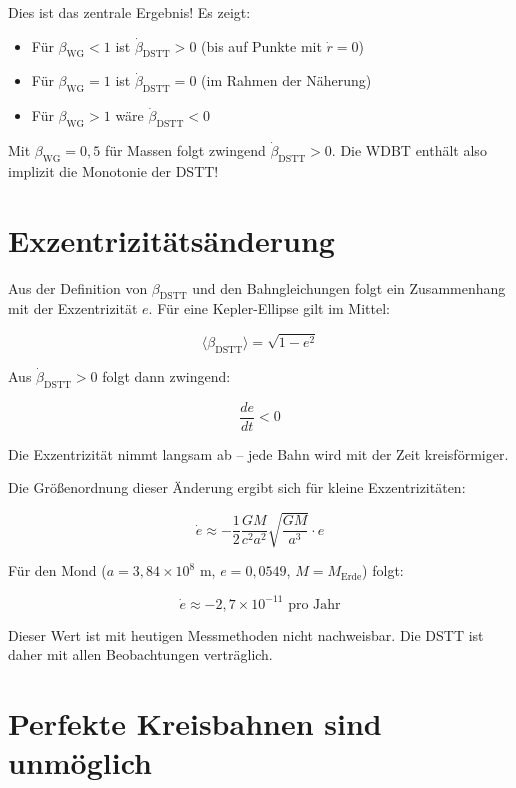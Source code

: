 Dies ist das zentrale Ergebnis! Es zeigt:

\begin{itemize}
    \item Für \(\beta_{\text{WG}} < 1\) ist \(\dot{\beta}_{\text{DSTT}} > 0\) (bis auf Punkte mit \(\dot{r} = 0\))
    \item Für \(\beta_{\text{WG}} = 1\) ist \(\dot{\beta}_{\text{DSTT}} = 0\) (im Rahmen der Näherung)
    \item Für \(\beta_{\text{WG}} > 1\) wäre \(\dot{\beta}_{\text{DSTT}} < 0\)
\end{itemize}

Mit \(\beta_{\text{WG}} = 0,5\) für Massen folgt zwingend \(\dot{\beta}_{\text{DSTT}} > 0\). Die WDBT enthält also implizit die Monotonie der DSTT!

\section{Exzentrizitätsänderung}
\label{sec:exzentrizitaetsaenderung}

Aus der Definition von \(\beta_{\text{DSTT}}\) und den Bahngleichungen folgt ein Zusammenhang mit der Exzentrizität \(e\). Für eine Kepler-Ellipse gilt im Mittel:

\[
\langle \beta_{\text{DSTT}} \rangle = \sqrt{1 - e^2}
\]

Aus \(\dot{\beta}_{\text{DSTT}} > 0\) folgt dann zwingend:

\[
\frac{de}{dt} < 0
\]

Die Exzentrizität nimmt langsam ab – jede Bahn wird mit der Zeit kreisförmiger.

Die Größenordnung dieser Änderung ergibt sich für kleine Exzentrizitäten:

\[
\dot{e} \approx -\frac{1}{2} \frac{GM}{c^2 a^2} \sqrt{\frac{GM}{a^3}} \cdot e
\]

Für den Mond (\(a = 3,84 \times 10^8\) m, \(e = 0,0549\), \(M = M_{\text{Erde}}\)) folgt:

\[
\dot{e} \approx -2,7 \times 10^{-11} \text{ pro Jahr}
\]

Dieser Wert ist mit heutigen Messmethoden nicht nachweisbar. Die DSTT ist daher mit allen Beobachtungen verträglich.

\section{Perfekte Kreisbahnen sind unmöglich}
\label{sec:kreisbahnen_unmoeglich}

